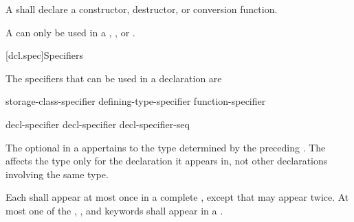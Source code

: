 \pnum
A  shall declare a
constructor, destructor, or conversion function.
\begin{note}
A  can only be used in a
,
, or
.
\end{note}

[dcl.spec]{Specifiers}%

\pnum
{}%
The specifiers that can be used in a declaration are
\begin{bnf}
\br
    storage-class-specifier\br
    defining-type-specifier\br
    function-specifier\br
    \br
    \br
    \br
    \br
    \br
\end{bnf}

\begin{bnf}
\br
    decl-specifier \br
    decl-specifier decl-specifier-seq
\end{bnf}

The optional  in a 
appertains to the type determined by the preceding
. The 
affects the type only for the declaration it appears in, not other declarations involving the
same type.

\pnum
Each 
shall appear at most once in a complete ,
except that  may appear twice.
At most one of
the , , and  keywords
shall appear in a .


